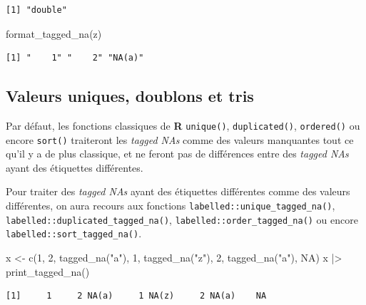 \documentclass[
  letterpaper,
  DIV=11,
  numbers=noendperiod,
  oneside]{scrreprt}
\newenvironment{Shaded}{\begin{snugshade}}{\end{snugshade}}
\newcommand{\ConstantTok}[1]{\textcolor[rgb]{0.56,0.35,0.01}{#1}}
\newcommand{\DecValTok}[1]{\textcolor[rgb]{0.68,0.00,0.00}{#1}}
\newcommand{\FunctionTok}[1]{\textcolor[rgb]{0.28,0.35,0.67}{#1}}
\newcommand{\NormalTok}[1]{\textcolor[rgb]{0.00,0.23,0.31}{#1}}
\newcommand{\OtherTok}[1]{\textcolor[rgb]{0.00,0.23,0.31}{#1}}
\newcommand{\SpecialCharTok}[1]{\textcolor[rgb]{0.37,0.37,0.37}{#1}}
\newcommand{\StringTok}[1]{\textcolor[rgb]{0.13,0.47,0.30}{#1}}
\begin{document}
\begin{tcolorbox}
\begin{verbatim}
[1] "double"
\end{verbatim}

\begin{Shaded}
\begin{Highlighting}[]
\FunctionTok{format\_tagged\_na}\NormalTok{(z)}
\end{Highlighting}
\end{Shaded}

\begin{verbatim}
[1] "    1" "    2" "NA(a)"
\end{verbatim}

\end{tcolorbox}

\hypertarget{valeurs-uniques-doublons-et-tris}{%
\subsection{Valeurs uniques, doublons et
tris}\label{valeurs-uniques-doublons-et-tris}}

Par défaut, les fonctions classiques de \textbf{R} \texttt{unique()},
\texttt{duplicated()}, \texttt{ordered()} ou encore \texttt{sort()}
traiteront les \emph{tagged NAs} comme des valeurs manquantes tout ce
qu'il y a de plus classique, et ne feront pas de différences entre des
\emph{tagged NAs} ayant des étiquettes différentes.

Pour traiter des \emph{tagged NAs} ayant des étiquettes différentes
comme des valeurs différentes, on aura recours aux fonctions
\texttt{labelled::unique\_tagged\_na()},
\texttt{labelled::duplicated\_tagged\_na()},
\texttt{labelled::order\_tagged\_na()} ou encore
\texttt{labelled::sort\_tagged\_na()}.

\begin{Shaded}
\begin{Highlighting}[]
\NormalTok{x }\OtherTok{\textless{}{-}} \FunctionTok{c}\NormalTok{(}\DecValTok{1}\NormalTok{, }\DecValTok{2}\NormalTok{, }\FunctionTok{tagged\_na}\NormalTok{(}\StringTok{"a"}\NormalTok{), }\DecValTok{1}\NormalTok{, }\FunctionTok{tagged\_na}\NormalTok{(}\StringTok{"z"}\NormalTok{), }\DecValTok{2}\NormalTok{, }\FunctionTok{tagged\_na}\NormalTok{(}\StringTok{"a"}\NormalTok{), }\ConstantTok{NA}\NormalTok{)}
\NormalTok{x }\SpecialCharTok{|\textgreater{}} 
  \FunctionTok{print\_tagged\_na}\NormalTok{()}
\end{Highlighting}
\end{Shaded}

\begin{verbatim}
[1]     1     2 NA(a)     1 NA(z)     2 NA(a)    NA
\end{verbatim}
\end{document}
